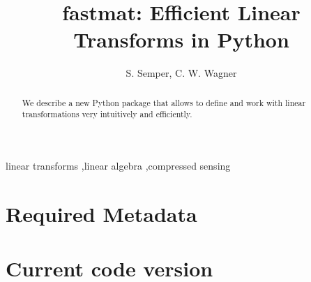 \documentclass[preprint, review, 12pt, a4paper]{elsarticle}
\begin{document}
\begin{frontmatter}



\title{fastmat: Efficient Linear Transforms in Python}


\author{S. Semper, C. W. Wagner}

\address{EMS Group, TU Ilmenau, some address}

\begin{abstract}
We describe a new Python package that allows to define and work with linear transformations very intuitively and efficiently.

\end{abstract}

\begin{keyword}
linear transforms \sep linear algebra \sep compressed sensing



\end{keyword}

\end{frontmatter}

\section*{Required Metadata}\label{metadata}

\section*{Current code version}\label{current_code}
\end{document}
